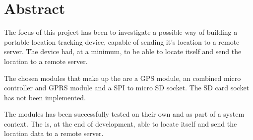 
\chapter{Abstract}
\label{sec:Abstract}
The focus of this project has been to investigate a possible way of building a portable location tracking device, capable of sending it's location to a remote server.
The device had, at a minimum, to be able to locate itself and send the location to a remote server.

The chosen modules that make up the \systemName are a \GPS GPS module, an \MKR combined micro controller and GPRS module and a \SDsock SPI to micro SD socket.
The SD card socket has not been implemented.

The modules has been successfully tested on their own and as part of a system context.
The \systemName is, at the end of development, able to locate itself and send the location data to a remote server.